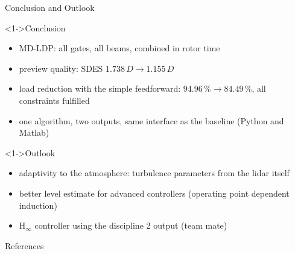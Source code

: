 \begin{frame}{Conclusion and Outlook}
	\begin{alertblock}<1->{Conclusion}
		\begin{itemize}
			\item MD-LDP: all gates, all beams, combined in rotor time
			\item preview quality: SDES $1.738\,D \rightarrow 1.155\,D$
			\item load reduction with the simple feedforward: $94.96\,\% \rightarrow 84.49\,\%$, all constraints fulfilled
			\item one algorithm, two outputs, same interface as the baseline (Python and Matlab)
		\end{itemize}
	\end{alertblock}
	\begin{block}<1->{Outlook}
		\begin{itemize}
			\item adaptivity to the atmosphere: turbulence parameters from the lidar itself \cite{Mann1994}
			\item better level estimate for advanced controllers (operating point dependent induction)
			\item H$_\infty$ controller using the discipline 2 output (team mate)
		\end{itemize}
	\end{block}
\end{frame}
\begin{frame}[allowframebreaks]{References}   %
	\printbibliography[heading=none]
\end{frame}
